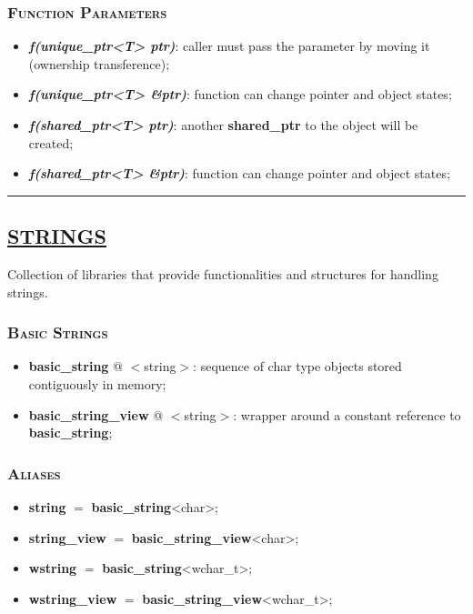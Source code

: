 \documentclass[10pt]{article}
\begin{document}
\begin{multicols*}{4}
{\subsubsection*{\textsc{Function Parameters}} 
\begin{itemize}[leftmargin=*,topsep=0.25pt]
  \setlength\itemsep{-1.8pt}
	\item  \emph{\textbf{f(unique\_ptr<T> ptr)}}: caller must pass the parameter by moving it (ownership transference);
	\item  \emph{\textbf{f(unique\_ptr<T> \&ptr)}}: function can change pointer and object states;
	\item  \emph{\textbf{f(shared\_ptr<T> ptr)}}: another \textbf{shared\_ptr} to the object will be created;
	\item  \emph{\textbf{f(shared\_ptr<T> \&ptr)}}: function can change pointer and object states;
\end{itemize}

}

\par\noindent\rule{197pt}{0.4pt}

{\color{Blue}
\subsection*{\href{https://en.cppreference.com/w/cpp/string}{\underline{STRINGS}}}	
\noindent
Collection of libraries that provide functionalities and structures for handling strings.

\subsubsection*{\textsc{Basic Strings}} 
\begin{itemize}[leftmargin=*,topsep=0.25pt]
  \setlength\itemsep{-1.8pt}
	\item  {\textbf{basic\_string}} @ $<$string$>$: sequence of char type objects stored contiguously in memory;
	\item  {\textbf{basic\_string\_view}} @ $<$string$>$: wrapper around a constant reference to \textbf{basic\_string};
\end{itemize}


\subsubsection*{\textsc{Aliases}} 
\begin{itemize}[leftmargin=*,topsep=0.25pt]
  \setlength\itemsep{-1.8pt}
	\item \textbf{string} $=$ \textbf{basic\_string}<char>;
	\item \textbf{string\_view} $=$ \textbf{basic\_string\_view}<char>;
	\item \textbf{wstring} $=$ \textbf{basic\_string}<wchar\_t>;
	\item \textbf{wstring\_view} $=$ \textbf{basic\_string\_view}<wchar\_t>;
\end{itemize}

}
\end{multicols*}
\end{document}
